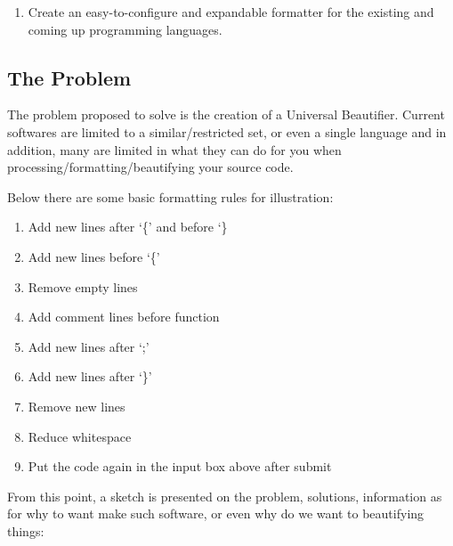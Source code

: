 \begin{englishtext}
    \medskip
    \begin{bluebox}
    \begin{enumerate}[nolistsep]
        \item Create an easy-to-configure and expandable formatter for the
        existing and coming up programming languages.
    \end{enumerate}
    \end{bluebox}



\subsection{The Problem}

    The problem proposed to solve is the creation of a Universal Beautifier.
    Current softwares are limited to a similar/restricted set, or even a single
    language and in addition, many are limited in what they can do for you when
    processing/formatting/beautifying your source code.
    \cite{universalCodeFormatter}

    Below there are some basic formatting rules for illustration:

    \medskip
    \begin{bluebox}
    \begin{enumerate}
        \item Add new lines after `\{' and before `\}
        \item Add new lines before `\{'
        \item Remove empty lines
        \item Add comment lines before function
        \item Add new lines after `;'
        \item Add new lines after `\}'
        \item Remove new lines
        \item Reduce whitespace
        \item Put the code again in the input box above after submit
    \end{enumerate}
    \end{bluebox}
    \vspace{-4mm}\begin{flushright}\textcite{prettyPrinter}\end{flushright}

    From this point, a sketch is presented on the problem, solutions,
    information as for why to want make such software, or even why do we want to
    beautifying things:


\end{englishtext}
